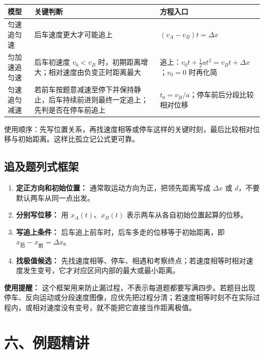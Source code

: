 \begin{center}
\renewcommand{\arraystretch}{1.18}
\begin{tabular}{p{}p{}p{}}
\toprule
模型 & 关键判断 & 方程入口 \\
\midrule
匀速追匀速 & 后车速度更大才可能追上 & $(v_A-v_B)t=\Delta x$ \\
匀加速追匀速 & 后车初速度 $v_0<v_B$ 时，初期距离增大；相对速度由负变正时距离最大 & 追上：$v_0t+\frac12 at^2=v_Bt+\Delta x$；$v_0=0$ 时再化简 \\
匀速追匀减速 & 若前车按题意减速至停下并保持静止，后车持续前进则最终一定追上；先判是否在停车前追上 & $t_0=v_B/a$；停车前后分段比较相对位移 \\
\bottomrule
\end{tabular}
\end{center}

\noindent 使用顺序：先写位置关系，再找速度相等或停车这样的关键时刻，最后比较相对位移与初始距离。这样比孤立记公式更可靠。

\subsection*{追及题列式框架}

\begin{enumerate}
  \item \textbf{定正方向和初始位置：} 通常取运动方向为正，把领先距离写成 $\Delta x$ 或 $d$，不要默认两车从同一点出发。
  \item \textbf{分别写位移：} 用 $x_A(t)$、$x_B(t)$ 表示两车从各自初始位置起算的位移。
  \item \textbf{写追上条件：} 后车追上前车时，后车多走的位移等于初始距离，即 $x_{\text{后}}-x_{\text{前}}=\Delta x$。
  \item \textbf{找极值候选：} 先找速度相等、停车、相遇和考察终点；若速度相等时相对速度发生变号，它才对应区间内部的最大或最小距离。
\end{enumerate}

\textbf{使用提醒：} 这个框架用来防止漏过程，不表示每道题都要写满四步。若题目出现停车、反向运动或分段速度图像，应优先把过程分清；若速度相等时刻不在实际过程内，或相对速度没有变号，就不能把它直接当作距离极值。

\section*{六、例题精讲}

